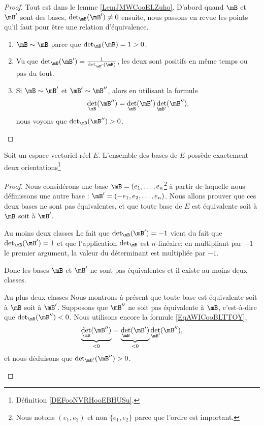 \begin{proof}
    Tout est dans le lemme \ref{LemJMWCooELZuho}. D'abord quand \( \mB\) et \( \mB'\) sont des bases, \( \det_{\mB}(\mB')\neq 0\) ensuite, nous passons en revue les points qu'il faut pour être une relation d'équivalence.
    \begin{enumerate}
        \item
            \( \mB\sim \mB\) parce que \( \det_{\mB}(\mB)=1>0\).
        \item
            Vu que \( \det_{\mB}(\mB')=\frac{1}{ \det_{\mB'}(\mB) }\), les deux sont positifs en même temps ou pas du tout.
        \item
            Si \( \mB\sim \mB'\) et \( \mB'\sim\mB''\), alors en utilisant la formule
            \begin{equation}
                \det_{\mB}(\mB'')=\det_{\mB}(\mB')\det_{\mB'}(\mB''),
            \end{equation}
            nous voyons que \( \det_{\mB}(\mB'')>0\).
    \end{enumerate}
\end{proof}

\begin{lemma}
    Soit un espace vectoriel réel \( E\). L'ensemble des bases de \( E\) possède exactement deux orientations\footnote{Définition \ref{DEFooNVRHooEBHUSu}.}
\end{lemma}

\begin{proof}
    Nous considérons une base \( \mB=(e_1,\ldots, e_n\)\footnote{Nous notons \( (e_1,e_2)\) et non \( \{ e_1,e_2 \}\) parce que l'ordre est important.} à partir de laquelle nous définissons une autre base : \( \mB'=( -e_1,e_2,\ldots, e_n )\). Nous allons prouver que ces deux bases ne sont pas équivalentes, et que toute base de \( E\) est équivalente soit à \( \mB\) soit à \( \mB'\).

    \begin{subproof}
        \item[Au moins deux classes]
            Le fait que \( \det_{\mB}(\mB')=-1\) vient du fait que \( \det_{\mB}(\mB')=1\) et que l'application \( \det_{\mB}\) est \( n\)-linéaire; en multipliant par \( -1\) le premier argument, la valeur du déterminant est multipliée par \( -1\).

            Donc les bases \( \mB\) et \( \mB'\) ne sont pas équivalentes et il existe au moins deux classes.

        \item[Au plus deux classes]
            Nous montrons à présent que toute base est équivalente soit à \( \mB\) soit à \( \mB'\). Supposons que \( \mB''\) ne soit pas équivalente à \( \mB\), c'est-à-dire que \( \det_{\mB}(\mB'')<0\). Nous utilisons encore la formule \eqref{EqAWICooBLTTOY},
            \begin{equation}
                \underbrace{\det_{\mB}(\mB'')}_{<0}=\underbrace{\det_{\mB}(\mB')}_{<0}\det_{\mB'}(\mB''),
            \end{equation}
            et nous déduisons que \( \det_{\mB'}(\mB'')>0\).
    \end{subproof}
\end{proof}

